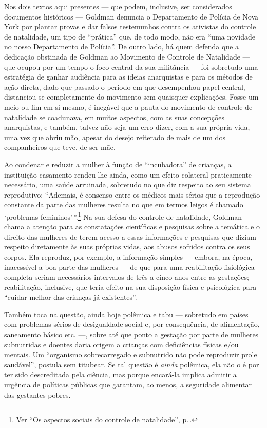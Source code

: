 Nos dois textos aqui presentes --- que podem, inclusive, ser considerados
documentos históricos --- Goldman denuncia o Departamento de Polícia de
Nova York por plantar provas e dar falsos testemunhos contra os
ativistas do controle de natalidade, um tipo de ``prática'' que, de todo
modo, não era ``uma novidade no nosso Departamento de
Polícia''. De outro lado, há quem defenda que a dedicação obstinada de
Goldman ao Movimento de Controle de Natalidade --- que ocupou por um tempo
o foco central da sua militância --- foi
sobretudo uma estratégia de ganhar audiência para as ideias anarquistas
e para os métodos de ação direta, dado que passado o período em que
desempenhou papel central, distanciou-se completamente do movimento sem
quaisquer explicações. Fosse um meio ou fim em si mesmo, é inegável que
a pauta do movimento de controle de natalidade se coadunava, em muitos
aspectos, com as suas concepções anarquistas, e também, talvez não seja
um erro dizer, com a sua própria vida, uma vez que abriu mão, apesar do
desejo reiterado de mais de um dos companheiros que teve, de ser mãe.

Ao condenar e reduzir a mulher à função de ``incubadora'' de crianças, a
instituição casamento rendeu-lhe ainda, como um efeito colateral
praticamente necessário, uma saúde arruinada, sobretudo no que diz
respeito ao seu sistema reprodutivo: ``Ademais, é consenso entre os médicos mais sérios que a reprodução constante da parte das mulheres resulta no que em termos leigos é
chamado `problemas femininos'\,''.\footnote{Ver ``Os aspectos sociais do controle de natalidade'', p.\,\pageref{saude}.} Na
sua defesa do controle de natalidade, Goldman chama a atenção
para as constatações científicas e pesquisas sobre a temática e o
direito das mulheres de terem acesso a essas informações e pesquisas que
diziam respeito diretamente às suas próprias vidas, aos abusos sofridos
contra os seus corpos. Ela reproduz, por exemplo, a informação simples
--- embora, na época, inacessível a boa parte das mulheres --- de que
para uma reabilitação fisiológica completa seriam necessários intervalos
de três a cinco anos entre as gestações; reabilitação, inclusive, que
teria efeito na sua disposição física e psicológica para ``cuidar melhor
das crianças já existentes''.

Também toca na questão, ainda hoje polêmica e tabu --- sobretudo em países com problemas sérios de desigualdade
social e, por consequência, de alimentação, saneamento básico etc. ---,
sobre até que ponto a gestação por parte de mulheres subnutridas e
doentes daria origem a crianças com deficiências físicas e/ou mentais.
Um ``organismo sobrecarregado e subnutrido não pode reproduzir prole
saudável'', postula sem titubear. Se tal questão é \emph{ainda} polêmica, ela
não o é por ter sido descreditada pela ciência, mas porque encará-la
implica admitir a urgência de políticas públicas que garantam, ao menos,
a seguridade alimentar das gestantes pobres.

